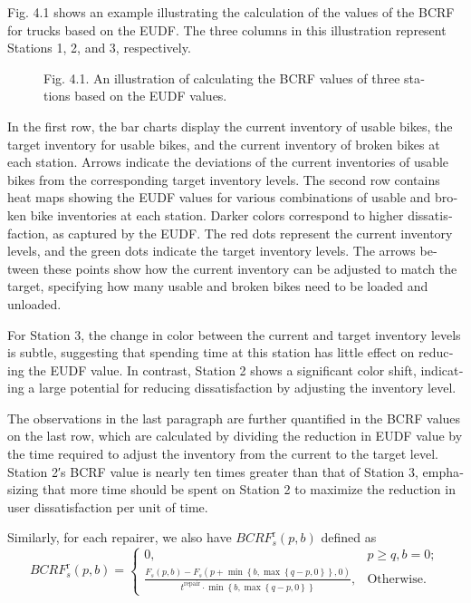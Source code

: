 \documentclass[
  english,
]{article}
\begin{document}
\begin{otherlanguage}{english}
\protect{}\label{p0480}
Fig. 4.1 shows an example illustrating the calculation of the values of the BCRF for trucks based on
the EUDF. The three columns in this illustration represent Stations 1, 2, and 3, respectively.

\begin{figure}
\centering
Fig. 4.1. An illustration of calculating the BCRF values of three stations based on the EUDF values.
\caption{}\label{f0020}
\end{figure}

\protect{}\label{p0485}
In the first row, the bar charts display the current inventory of usable bikes, the target inventory
for usable bikes, and the current inventory of broken bikes at each station. Arrows indicate the
deviations of the current inventories of usable bikes from the corresponding target inventory
levels. The second row contains heat maps showing the EUDF values for various combinations of usable
and broken bike inventories at each station. Darker colors correspond to higher dissatisfaction, as
captured by the EUDF. The red dots represent the current inventory levels, and the green dots
indicate the target inventory levels. The arrows between these points show how the current inventory
can be adjusted to match the target, specifying how many usable and broken bikes need to be loaded
and unloaded.

\protect{}\label{p0490}
For Station 3, the change in color between the current and target inventory levels is subtle,
suggesting that spending time at this station has little effect on reducing the EUDF value. In
contrast, Station 2 shows a significant color shift, indicating a large potential for reducing
dissatisfaction by adjusting the inventory level.

\protect{}\label{p0495}
The observations in the last paragraph are further quantified in the BCRF values on the last row,
which are calculated by dividing the reduction in EUDF value by the time required to adjust the
inventory from the current to the target level. Station 2′s BCRF value is nearly ten times greater
than that of Station 3, emphasizing that more time should be spent on Station 2 to maximize the
reduction in user dissatisfaction per unit of time.

\protect{}\label{p0500}
Similarly, for each repairer, we also have \(\mathit{BCR}F_{s}^{\text{r}}\left( {p,b} \right)\)
defined as\[\tag{69}\mathit{BCR}F_{s}^{\text{r}}\left( {p,b} \right) = \left\{ \begin{array}{lc}
{0,} & {p \geq q,b = 0;} \\
{\frac{F_{s}\left( {p,b} \right) - F_{s}\left( {p + \min\left\{ {b,\max\left\{ {q - p,0} \right\}} \right\},0} \right)}{t^{\text{repair}} \cdot \min\left\{ {b,\max\left\{ {q - p,0} \right\}} \right\}},} & {\text{Otherwise}\text{.}}
\end{array} \right.\]


\end{otherlanguage}
\end{document}
